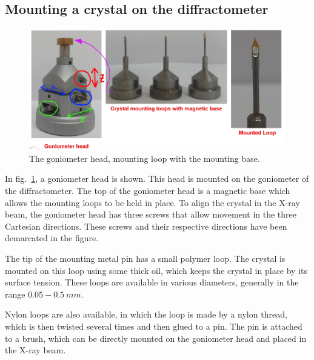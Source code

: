 \subsection{Mounting a crystal on the diffractometer}

	\begin{figure}[t]
		\includegraphics[scale=0.5]{goniometer_mod.png}
		\caption{\label{fig:goniometer}The goniometer head, mounting loop with the mounting base.}
	\end{figure}

	In fig.~\ref{fig:goniometer}, a goniometer head is shown. This head is mounted on the goniometer of the diffractometer. The top of the goniometer head is a magnetic base which allows the mounting loops to be held in place. To align the crystal in the X-ray beam, the goniometer head has three screws that allow movement in the three Cartesian directions. These screws and their respective directions have been demarcated in the figure.

		The tip of the mounting metal pin has a small polymer loop. The crystal is mounted on this loop using some thick oil, which keeps the crystal in place by its surface tension. These loops are available in various diameters, generally in the range $0.05-0.5~\si{mm}.$

		Nylon loops are also available, in which the loop is made by a nylon thread, which is then twisted several times and then glued to a pin. The pin is attached to a brush, which can be directly mounted on the goniometer head and placed in the X-ray beam.